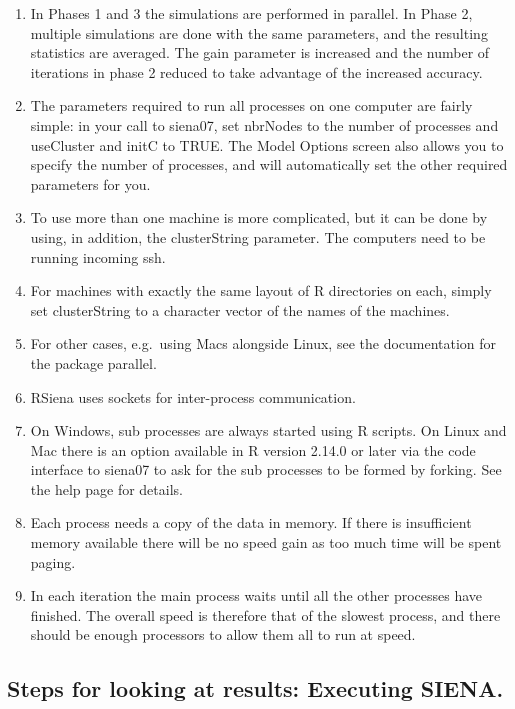 \documentclass[a4paper,fleqn,11pt]{article}
\newcommand{\+}{\, + \,}
\newcommand{\sfn}[1]{\textsf{#1}}
\newcommand{\R}{{\sf R }}
\newcommand{\RS}{{\sf RSiena }}
\newcommand{\si}{{\sf SIENA}}
\begin{document}
{\begin{enumerate}
\item In Phases 1 and 3 the simulations are performed in parallel. In Phase 2,
  multiple simulations are done with the same parameters, and the resulting
  statistics are averaged. The gain parameter is increased and the
  number of iterations in phase 2 reduced to take advantage of
  the increased accuracy.

\item The parameters required to run all processes on one computer are fairly
  simple: in your call to \sfn{siena07}, set \sfn{nbrNodes} to the number of
  processes and \sfn{useCluster} and \sfn{initC} to TRUE. The \sfn{Model
    Options} screen also allows you to specify the number of processes, and
  will automatically set the other required parameters for you.

\item To use more than one machine is more complicated, but it can be done by
  using, in addition, the \sfn{clusterString} parameter.  The computers need to
  be running incoming \sfn{ssh}.
\item For machines with exactly the same layout of \R
  directories on each, simply set \sfn{clusterString} to a character vector of
  the names of the machines.
\item For other cases, e.g.\ using Macs alongside Linux,
  see the documentation for the package \sfn{parallel}.

\item \RS uses sockets for inter-process communication.
\item On Windows, sub processes are always started using \R scripts. On Linux
  and Mac there is an option available in \R version 2.14.0 or later via the
  code interface to \sfn{siena07} to ask for the sub processes to be formed by
  forking. See the help page for details.
\item Each process needs a copy of the data in memory. If there is insufficient
  memory available there will be no speed gain as too much time will be spent
  paging.
\item In each iteration the main process waits until all the other processes
  have finished. The overall speed is therefore that of the slowest process, and
  there should be enough processors to allow them all to run at speed.
\end{enumerate}

\subsection{Steps for looking at results: Executing \si .}
\label{S_exec}

}
\end{document}

